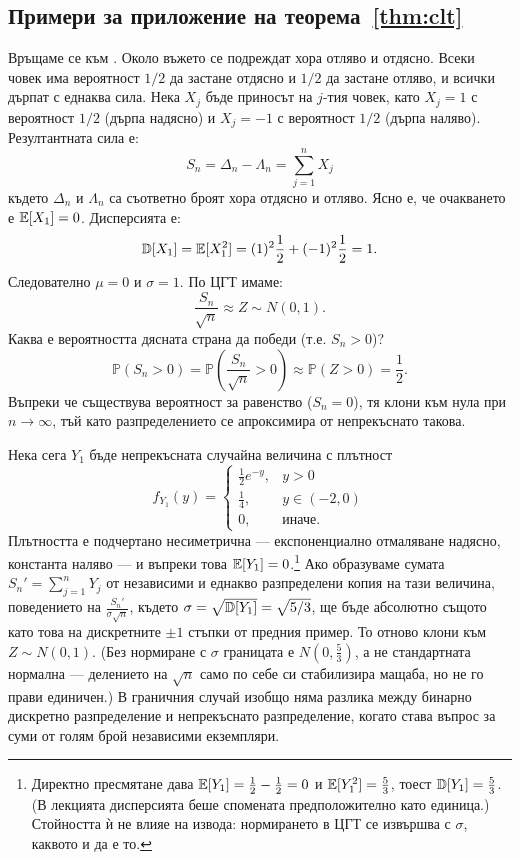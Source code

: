 \subsection{Примери за приложение на теорема~\ref{thm:clt}}

\begin{example}\label{ex:11-1}
Връщаме се към . Около въжето се подреждат хора отляво и отдясно. Всеки човек има вероятност $1/2$ да застане отдясно и $1/2$ да застане отляво, и всички дърпат с еднаква сила. Нека $X_j$ бъде приносът на $j$-тия човек, като $X_j = 1$ с вероятност $1/2$ (дърпа надясно) и $X_j = -1$ с вероятност $1/2$ (дърпа наляво). Резултантната сила е:
\[ S_n = \Delta_n - \Lambda_n = \sum_{j=1}^n X_j \]
където $\Delta_n$ и $\Lambda_n$ са съответно броят хора отдясно и отляво. Ясно е, че очакването е $\mathbb{E}[X_1] = 0$. Дисперсията е:
\[ \mathbb{D}[X_1] = \mathbb{E}[X_1^2] = (1)^2 \frac{1}{2} + (-1)^2 \frac{1}{2} = 1. \]
Следователно $\mu=0$ и $\sigma=1$. По ЦГТ имаме:
\[ \frac{S_n}{\sqrt{n}} \approx Z \sim N(0,1). \]
Каква е вероятността дясната страна да победи (т.е. $S_n > 0$)?
\[ \mathbb{P}(S_n > 0) = \mathbb{P}\left(\frac{S_n}{\sqrt{n}} > 0\right) \approx \mathbb{P}(Z > 0) = \frac{1}{2}. \]
Въпреки че съществува вероятност за равенство ($S_n = 0$), тя клони към нула при $n \to \infty$, тъй като разпределението се апроксимира от непрекъснато такова.

\end{example}

\begin{example}
Нека сега\label{ex:11-2} $Y_1$ бъде непрекъсната случайна величина с плътност
\[
f_{Y_1}(y) =
\begin{cases}
\tfrac{1}{2} e^{-y}, & y > 0 \\[2pt]
\tfrac{1}{4}, & y \in (-2, 0) \\[2pt]
0, & \text{иначе.}
\end{cases}
\]
Плътността е подчертано несиметрична — експоненциално отмаляване надясно, константа наляво — и въпреки това $\mathbb{E}[Y_1] = 0$.\footnote{Директно пресмятане дава $\mathbb{E}[Y_1] = \tfrac12 - \tfrac12 = 0$ и $\mathbb{E}[Y_1^2] = \tfrac53$, тоест $\mathbb{D}[Y_1] = \tfrac53$. (В лекцията дисперсията беше спомената предположително като единица.) Стойността ѝ не влияе на извода: нормирането в ЦГТ се извършва с $\sigma$, каквото и да е то.}
Ако образуваме сумата $S_n' = \sum_{j=1}^n Y_j$ от независими и еднакво разпределени копия
на тази величина, поведението на $\frac{S_n'}{\sigma\sqrt{n}}$, където
$\sigma = \sqrt{\mathbb{D}[Y_1]} = \sqrt{5/3}$, ще бъде абсолютно същото като това на дискретните
$\pm 1$ стъпки от предния пример. То отново клони към $Z \sim N(0,1)$. (Без нормиране с
$\sigma$ границата е $N(0, \tfrac53)$, а не стандартната нормална — делението на $\sqrt{n}$
само по себе си стабилизира мащаба, но не го прави единичен.) В граничния случай изобщо няма
разлика между бинарно дискретно разпределение и непрекъснато разпределение, когато става
въпрос за суми от голям брой независими екземпляри.

\end{example}

